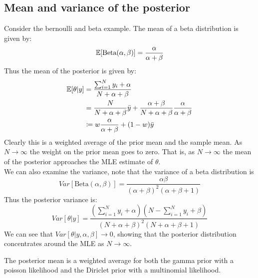 \documentclass[DIV=14,titlepage=false]{scrreprt}
\begin{document}
\subsection{Mean and variance of the posterior}
Consider the bernoulli and beta example. The mean of a beta distribution is given by:
\[
    \mathbb{E}[\text{Beta}(\alpha,\beta)] = \frac{\alpha}{\alpha+\beta}
\]
Thus the mean of the posterior is given by:
\begin{align*}
    \mathbb{E}[\theta|y] &= \frac{\sum_{i=1}^N y_i + \alpha}{N+\alpha+\beta}\\
    &= \frac{N}{N+\alpha+\beta}\bar{y} + \frac{\alpha+\beta}{N+\alpha+\beta}\frac{\alpha}{\alpha+\beta}\\
    &\coloneq w \frac{\alpha}{\alpha+\beta} + (1-w)\bar{y}
\end{align*}
Clearly this is a weighted average of the prior mean and the sample mean. As $N\to\infty$ the weight on the prior mean goes to zero. That is, as $N \to \infty$ the mean of the posterior approaches the MLE estimate of $\theta$.\\
We can also examine the variance, note that the variance of a beta distribution is 
\[
    Var[\text{Beta}(\alpha,\beta)] = \frac{\alpha\beta}{(\alpha+\beta)^2(\alpha+\beta+1)}
\]
Thus the posterior variance is:
\[
    Var[\theta|y] = \frac{(\sum_{i=1}^N y_i + \alpha)(N-\sum_{i=1}^N y_i + \beta)}{(N+\alpha+\beta)^2(N+\alpha+\beta+1)}
\]
We can see that $Var[\theta|y, \alpha, \beta] \to 0$, showing that the posterior distribution concentrates around the MLE as $N\to\infty$.
\begin{claim}
    The posterior mean is a weighted average for both the gamma prior with a poisson likelihood and the Diriclet prior with a multinomial likelihood.
\end{claim}
\end{document}

